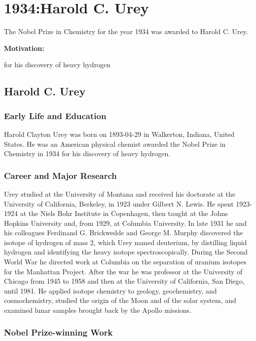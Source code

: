 \chapter{1934:Harold C. Urey}

\label{chap:chemistry1934}

The Nobel Prize in Chemistry for the year 1934 was awarded to Harold C. Urey.

\textbf{Motivation:}

for his discovery of heavy hydrogen

\section{Harold C. Urey}

\subsection*{Early Life and Education}

Harold Clayton Urey was born on 1893-04-29 in Walkerton, Indiana, United States.
He was an American physical chemist awarded the Nobel Prize in Chemistry in 1934 for his discovery of heavy hydrogen.

\subsection*{Career and Major Research}

Urey studied at the University of Montana and received his doctorate at the University of California, Berkeley, in 1923 under Gilbert N. Lewis.
He spent 1923-1924 at the Niels Bohr Institute in Copenhagen, then taught at the Johns Hopkins University and, from 1929, at Columbia University.
In late 1931 he and his colleagues Ferdinand G. Brickwedde and George M. Murphy discovered the isotope of hydrogen of mass 2, which Urey named deuterium, by distilling liquid hydrogen and identifying the heavy isotope spectroscopically.
During the Second World War he directed work at Columbia on the separation of uranium isotopes for the Manhattan Project.
After the war he was professor at the University of Chicago from 1945 to 1958 and then at the University of California, San Diego, until 1981.
He applied isotope chemistry to geology, geochemistry, and cosmochemistry, studied the origin of the Moon and of the solar system, and examined lunar samples brought back by the Apollo missions.

\subsection*{Nobel Prize-winning Work}

